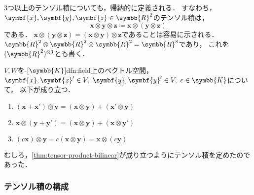 \documentclass[../sotsu.tex]{subfiles}
\begin{document}
3つ以上のテンソル積についても，帰納的に定義される．
すなわち，$\symbf{x}, \symbf{y}, \symbf{z} \in \symbb{R}^2$のテンソル積は，
\begin{equation*}
    \symbf{x} \otimes \symbf{y} \otimes \symbf{z}
    \coloneq 
    \symbf{x} \otimes (\symbf{y} \otimes \symbf{z})
\end{equation*}
である．
$\symbf{x} \otimes (\symbf{y} \otimes \symbf{z}) = (\symbf{x} \otimes \symbf{y}) \otimes \symbf{z}$であることは容易に示される．
$\symbb{R}^2 \otimes \symbb{R}^2 \otimes \symbb{R}^2 = \symbb{R}^8$であり，
これを$(\symbb{R}^2)^{\otimes 3}$とも書く．


\begin{proposition}
    \label{thm:tensor-product-bilinear}
    $V, W$を-[$\symbb{K}$]{dfn:field}上のベクトル空間，
    $\symbf{x}, \symbf{x}' \in V, \  \symbf{y}, \symbf{y}' \in V, \  c \in \symbb{K}$について，
    以下が成り立つ．
    \begin{enumerate}
        \item $(\symbf{x} + \symbf{x}') \otimes \symbf{y} = (\symbf{x} \otimes \symbf{y}) + (\symbf{x}' \otimes \symbf{y})$
        \item $\symbf{x} \otimes (\symbf{y} + \symbf{y}') = (\symbf{x} \otimes \symbf{y}) + (\symbf{x} \otimes \symbf{y}')$
        \item $(c \symbf{x}) \otimes \symbf{y} = c (\symbf{x} \otimes \symbf{y}) = \symbf{x} \otimes (c \symbf{y})$
    \end{enumerate}
\end{proposition}

むしろ，\cref{thm:tensor-product-bilinear}が成り立つようにテンソル積を定めたのであった．




\subsubsection*{テンソル積の構成}
\end{document}
